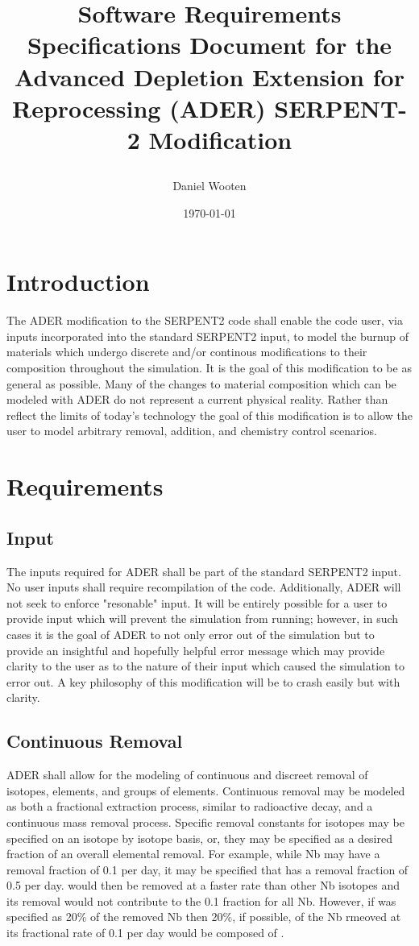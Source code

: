 \documentclass[12pt]{article}
\title{Software Requirements Specifications Document for the Advanced Depletion Extension for Reprocessing (ADER) SERPENT-2 Modification \\ {\small \date{\today}}}
\author{Daniel Wooten}
\begin{document}
\maketitle

\section{Introduction}
The ADER modification to the SERPENT2 code shall enable the code user, via
inputs incorporated into the standard SERPENT2 input, to model the burnup of materials which
undergo discrete and/or continous modifications to their composition throughout
the simulation. It is the goal of this modification to be as general as
possible. Many of the changes to material composition which can be modeled
with ADER do not represent a current physical reality. Rather than reflect
the limits of today's technology the goal of this modification is to allow
the user to model arbitrary removal, addition, and chemistry control scenarios.
\section{Requirements}
\subsection{Input}
The inputs required for ADER shall be part of the standard SERPENT2 input. No
user inputs shall require recompilation of the code.
Additionally, ADER will not seek to enforce "resonable" input. It
will be entirely possible for a user to provide input which will prevent
the simulation from running; however, in such cases it is the goal of ADER
to not only error out of the simulation but to provide an insightful and
hopefully helpful error message which may provide clarity to the user as to
the nature of their input which caused the simulation to error out. A key
philosophy of this modification will be to crash easily but with clarity.
\subsection{Continuous Removal}
ADER shall allow for the modeling of continuous and discreet removal of isotopes,
elements, and groups of elements. Continuous removal may be modeled as both
a fractional extraction process, similar to radioactive decay, and a continuous
mass removal process. Specific removal constants for isotopes may be specified
on an isotope by isotope basis, or, they may be specified as a desired fraction
of an overall elemental removal.
For example, while
Nb may have a removal fraction of 0.1 per day, it may be specified that
 has a removal fraction of 0.5 per day. 
would then be removed at a faster rate than other Nb isotopes and its removal
would not contribute to the 0.1 fraction for all Nb. However, if 
 was specified as 20\% of the removed Nb then 20\%,
if possible, of the Nb rmeoved at its fractional rate of 0.1 per day would be
composed of .  
\end{document}
